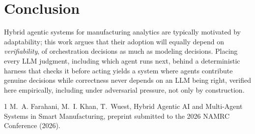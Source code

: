 \documentclass[5p,times]{elsarticle}
\begin{document}
\section{Conclusion}
Hybrid agentic systems for manufacturing analytics are typically motivated by adaptability; this work argues that their adoption will equally depend on \emph{verifiability}, of orchestration decisions as much as modeling decisions. Placing every LLM judgment, including which agent runs next, behind a deterministic harness that checks it before acting yields a system where agents contribute genuine decisions while correctness never depends on an LLM being right, verified here empirically, including under adversarial pressure, not only by construction.

\begin{thebibliography}{1}
M.~A. Farahani, M.~I. Khan, T.~Wuest, Hybrid Agentic AI and Multi-Agent Systems in Smart Manufacturing, preprint submitted to the 2026 NAMRC Conference (2026).
\end{thebibliography}
\end{document}
